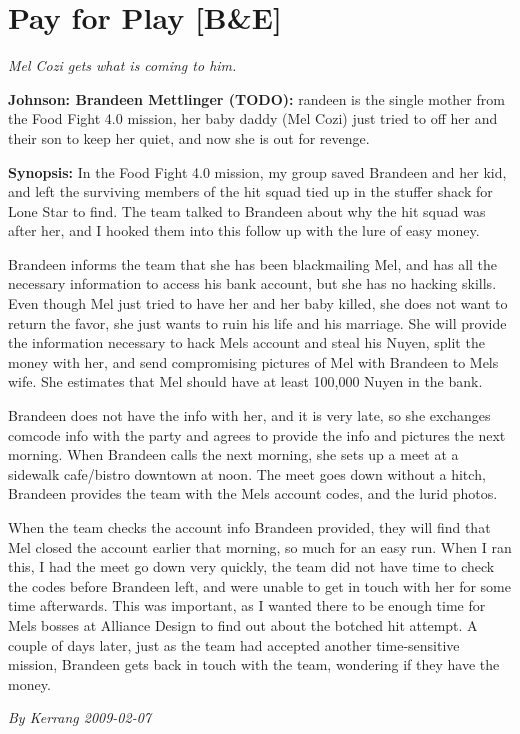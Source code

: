 \documentclass[letterpaper,twocolumn,10.5pt]{article}
\newenvironment{scenario}[6]
	{
		\section{#1 {\small[#2]}}
		\textit{#3}
		\def\TMPSCENARIO{#4 #5}
	}
	{\small\textit{By \TMPSCENARIO}}
\newcommand{\johnson}[2]{\textbf{Johnson: #1 (#2):}}
\newcommand{\synopsis}{\textbf{Synopsis: }}
\begin{document}
\begin{scenario}{Pay for Play}
	{B\&E}
	{ Mel Cozi gets what is coming to him.}
	{Kerrang}
	{2009-02-07}
	{https://forum.rpg.net/showthread.php?321504-Shadowrun-4th-101-Instant-Scenarios\&p=9948053#post9948053}

\johnson{Brandeen Mettlinger}{TODO}  randeen is the single mother from the Food Fight 4.0 mission, her baby daddy (Mel Cozi) just tried to off her and their son to keep her quiet, and now she is out for revenge.

\synopsis In the Food Fight 4.0 mission, my group saved Brandeen and her kid, and left the surviving members of the hit squad tied up in the stuffer shack for Lone Star to find. The team talked to Brandeen about why the hit squad was after her, and I hooked them into this follow up with the lure of easy money.

Brandeen informs the team that she has been blackmailing Mel, and has all the necessary information to access his bank account, but she has no hacking skills. Even though Mel just tried to have her and her baby killed, she does not want to return the favor, she just wants to ruin his life and his marriage. She will provide the information necessary to hack Mels account and steal his Nuyen, split the money with her, and send compromising pictures of Mel with Brandeen to Mels wife. She estimates that Mel should have at least 100,000 Nuyen in the bank.

Brandeen does not have the info with her, and it is very late, so she exchanges comcode info with the party and agrees to provide the info and pictures the next morning. When Brandeen calls the next morning, she sets up a meet at a sidewalk cafe/bistro downtown at noon. The meet goes down without a hitch, Brandeen provides the team with the Mels account codes, and the lurid photos.

When the team checks the account info Brandeen provided, they will find that Mel closed the account earlier that morning, so much for an easy run. When I ran this, I had the meet go down very quickly, the team did not have time to check the codes before Brandeen left, and were unable to get in touch with her for some time afterwards. This was important, as I wanted there to be enough time for Mels bosses at Alliance Design to find out about the botched hit attempt. A couple of days later, just as the team had accepted another time-sensitive mission, Brandeen gets back in touch with the team, wondering if they have the money.


\end{scenario}
\end{document}
